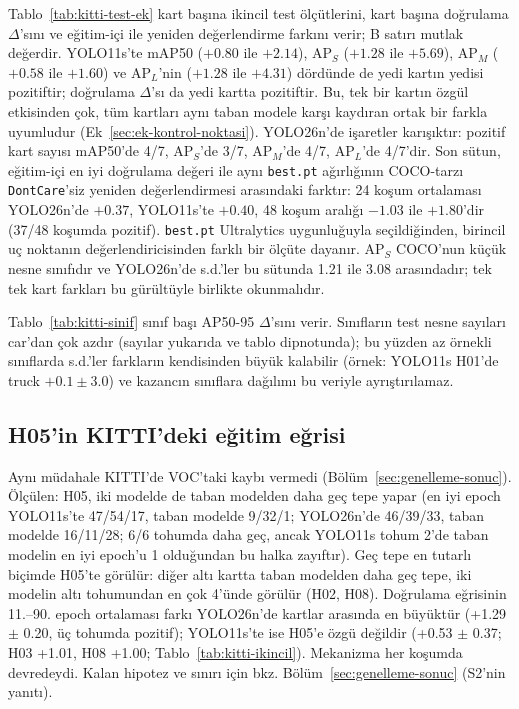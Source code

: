 Tablo~\ref{tab:kitti-test-ek} kart başına ikincil test ölçütlerini, kart başına doğrulama $\Delta$'sını ve eğitim-içi ile yeniden değerlendirme farkını verir; B satırı mutlak değerdir. YOLO11s'te mAP50 ($+0.80$ ile $+2.14$), AP$_S$ ($+1.28$ ile $+5.69$), AP$_M$ ($+0.58$ ile $+1.60$) ve AP$_L$'nin ($+1.28$ ile $+4.31$) dördünde de yedi kartın yedisi pozitiftir; doğrulama $\Delta$'sı da yedi kartta pozitiftir. Bu, tek bir kartın özgül etkisinden çok, tüm kartları aynı taban modele karşı kaydıran ortak bir farkla uyumludur (Ek~\ref{sec:ek-kontrol-noktasi}). YOLO26n'de işaretler karışıktır: pozitif kart sayısı mAP50'de 4/7, AP$_S$'de 3/7, AP$_M$'de 4/7, AP$_L$'de 4/7'dir. Son sütun, eğitim-içi en iyi doğrulama değeri ile aynı \texttt{best.pt} ağırlığının COCO-tarzı \texttt{DontCare}'siz yeniden değerlendirmesi arasındaki farktır: 24 koşum ortalaması YOLO26n'de $+0.37$, YOLO11s'te $+0.40$, 48 koşum aralığı $-1.03$ ile $+1.80$'dir (37/48 koşumda pozitif). \texttt{best.pt} Ultralytics uygunluğuyla seçildiğinden, birincil uç noktanın değerlendiricisinden farklı bir ölçüte dayanır. AP$_S$ COCO'nun küçük nesne sınıfıdır ve YOLO26n'de s.d.'ler bu sütunda 1.21 ile 3.08 arasındadır; tek tek kart farkları bu gürültüyle birlikte okunmalıdır.



Tablo~\ref{tab:kitti-sinif} sınıf başı AP50-95 $\Delta$'sını verir. Sınıfların test nesne sayıları car'dan çok azdır (sayılar yukarıda ve tablo dipnotunda); bu yüzden az örnekli sınıflarda s.d.'ler farkların kendisinden büyük kalabilir (örnek: YOLO11s H01'de truck $+0.1\pm3.0$) ve kazancın sınıflara dağılımı bu veriyle ayrıştırılamaz.

\subsection{H05'in KITTI'deki eğitim eğrisi}\label{sec:ek-h05-kitti}
Aynı müdahale KITTI'de VOC'taki kaybı vermedi (Bölüm~\ref{sec:genelleme-sonuc}). Ölçülen: H05, iki modelde de taban modelden daha geç tepe yapar (en iyi epoch YOLO11s'te 47/54/17, taban modelde 9/32/1; YOLO26n'de 46/39/33, taban modelde 16/11/28; 6/6 tohumda daha geç, ancak YOLO11s tohum 2'de taban modelin en iyi epoch'u 1 olduğundan bu halka zayıftır). Geç tepe en tutarlı biçimde H05'te görülür: diğer altı kartta taban modelden daha geç tepe, iki modelin altı tohumundan en çok 4'ünde görülür (H02, H08). Doğrulama eğrisinin 11.--90. epoch ortalaması farkı YOLO26n'de kartlar arasında en büyüktür (+1.29 $\pm$ 0.20, üç tohumda pozitif); YOLO11s'te ise H05'e özgü değildir (+0.53 $\pm$ 0.37; H03 +1.01, H08 +1.00; Tablo~\ref{tab:kitti-ikincil}). Mekanizma her koşumda devredeydi. Kalan hipotez ve sınırı için bkz. Bölüm~\ref{sec:genelleme-sonuc} (S2'nin yanıtı).

